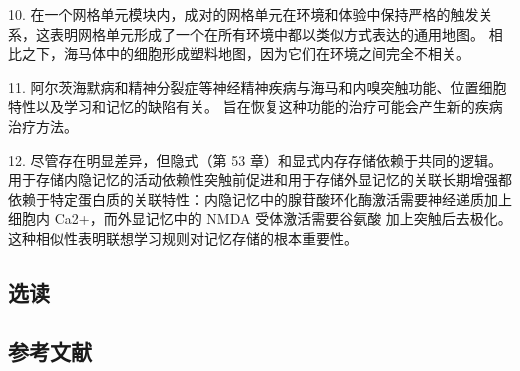 10. 在一个网格单元模块内，成对的网格单元在环境和体验中保持严格的触发关系，这表明网格单元形成了一个在所有环境中都以类似方式表达的通用地图。 相比之下，海马体中的细胞形成塑料地图，因为它们在环境之间完全不相关。 

11. 阿尔茨海默病和精神分裂症等神经精神疾病与海马和内嗅突触功能、位置细胞特性以及学习和记忆的缺陷有关。 旨在恢复这种功能的治疗可能会产生新的疾病治疗方法。 

12. 尽管存在明显差异，但隐式（第 53 章）和显式内存存储依赖于共同的逻辑。 用于存储内隐记忆的活动依赖性突触前促进和用于存储外显记忆的关联长期增强都依赖于特定蛋白质的关联特性：内隐记忆中的腺苷酸环化酶激活需要神经递质加上细胞内 Ca2+，而外显记忆中的 NMDA 受体激活需要谷氨酸 加上突触后去极化。 这种相似性表明联想学习规则对记忆存储的根本重要性。


\subsection{选读}
\subsection{参考文献}


